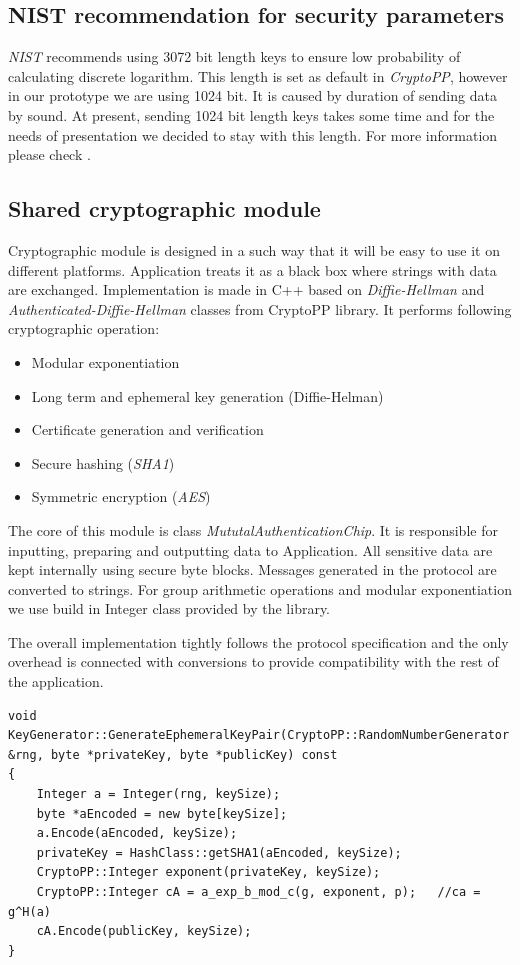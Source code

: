 \documentclass[11pt,titlepage]{article}
\theoremstyle{plain}
\begin{document}
\subsection{NIST recommendation for security parameters}

\textit{NIST} recommends using 3072 bit length keys to ensure low probability of calculating discrete logarithm. This length is set as default in \textit{CryptoPP}, however in our prototype we are using 1024 bit. It is caused by duration of sending data by sound. At present, sending 1024 bit length keys takes some time and for the needs of presentation we decided to stay with this length. For more information please check \cite{NIST}.

\subsection{Shared cryptographic module}
Cryptographic module is designed in a such way that it will be easy to use it on different platforms. Application treats it as a black box where strings with data are exchanged. Implementation is made in C++ based on \textit{Diffie-Hellman} and \textit{Authenticated-Diffie-Hellman} classes from CryptoPP library. It performs following cryptographic operation:

\begin{itemize}
\item Modular exponentiation
\item Long term and ephemeral key generation (Diffie-Helman)
\item Certificate generation and verification
\item Secure hashing (\textit{SHA1})
\item Symmetric encryption (\textit{AES})
\end{itemize}

The core of this module is class \textit{MututalAuthenticationChip}. It is responsible for inputting, preparing and outputting data to Application. All sensitive data are kept internally using secure byte blocks. Messages generated in the protocol are converted to strings.
For group arithmetic operations and modular exponentiation we use build in Integer class provided by the library. 

\vspace{5mm}

The overall implementation tightly follows the protocol specification and the only overhead is connected with conversions to provide compatibility with the rest of the application.
\begin{lstlisting}
void KeyGenerator::GenerateEphemeralKeyPair(CryptoPP::RandomNumberGenerator &rng, byte *privateKey, byte *publicKey) const
{
    Integer a = Integer(rng, keySize);
    byte *aEncoded = new byte[keySize];
    a.Encode(aEncoded, keySize);
    privateKey = HashClass::getSHA1(aEncoded, keySize);
    CryptoPP::Integer exponent(privateKey, keySize);
    CryptoPP::Integer cA = a_exp_b_mod_c(g, exponent, p);   //ca = g^H(a)
    cA.Encode(publicKey, keySize);
}
\end{lstlisting}
\end{document}
